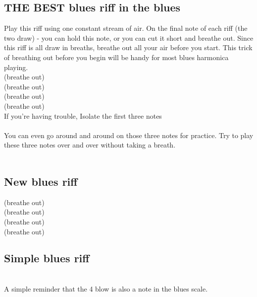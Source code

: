 
    \subsection{THE BEST blues riff in the blues}
        Play this riff using one constant stream of air. On the final note of each riff (the two draw)
        - you can hold this note, or you can cut it short and breathe out. Since this riff is all draw in breaths, breathe out all your air before you start. This trick of breathing out before you begin will be handy for most blues harmonica playing.\\
            \4\fdb\3\2  (breathe out)        \\
            \4\fdb\3\2  (breathe out)        \\
            \4\fdb\3\2   (breathe out)       \\
            \4\fdb\3\2  (breathe out)        \\
            
        If you're having trouble, Isolate the first three notes \\
                    \4\fdb\3\ \\
                    You can even go around and around on those three notes for practice.
                    Try to play these three notes over and over without taking a breath. \\
                         \4 \fdb \3 \4 \fdb \3 \\
                         \4 \fdb \3 \4 \fdb \3
            
\newpage
        \subsection{New blues riff}
        \2 \3 \4  (breathe out)\\
        \4\fdb\3\2  (breathe out)        \\
        \2 \3 \4   (breathe out)\\
        \4\fdb\3\2  (breathe out)        \\    
            
                \subsection{Simple blues riff}
        \\ A simple reminder that the 4 blow is also a note in the blues scale. \\
            \4\four\3\2         \\
            \4\four\3\2         \\
            \4\four\3\2         \\
            \4\four\3\2         \\    
            